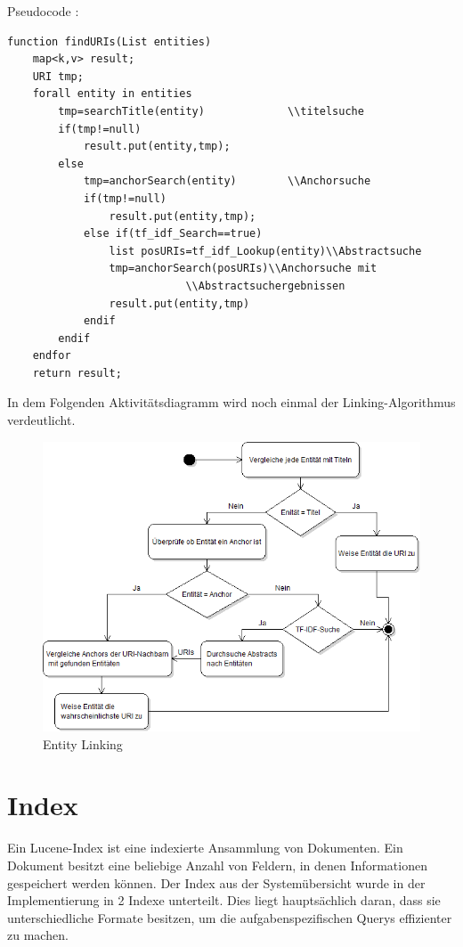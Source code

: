 \documentclass[11pt, a4paper, oneside]{Thesis} %
\begin{document}
Pseudocode :
\begin{lstlisting}
function findURIs(List entities)
	map<k,v> result;
	URI tmp;
	forall entity in entities
		tmp=searchTitle(entity)				\\titelsuche
		if(tmp!=null)
			result.put(entity,tmp);
		else
			tmp=anchorSearch(entity)		\\Anchorsuche
			if(tmp!=null)
				result.put(entity,tmp);
			else if(tf_idf_Search==true)
				list posURIs=tf_idf_Lookup(entity)\\Abstractsuche
				tmp=anchorSearch(posURIs)\\Anchorsuche mit 
							\\Abstractsuchergebnissen
				result.put(entity,tmp)
			endif
		endif
	endfor
	return result;
\end{lstlisting}
\clearpage
In dem Folgenden Aktivit\"atsdiagramm wird noch einmal der Linking-Algorithmus verdeutlicht.
\begin{figure}[ht!]
\centering
\includegraphics[scale=0.55]{./ablauf.png}
\caption[Entity Linking]{Entity Linking}
\end{figure}


\section{Index}
Ein Lucene-Index ist eine indexierte Ansammlung von Dokumenten. Ein Dokument besitzt eine beliebige Anzahl von Feldern, in denen Informationen gespeichert werden k\"onnen. 
Der Index aus der System\"ubersicht wurde in der Implementierung in 2 Indexe unterteilt. Dies liegt haupts\"achlich daran, dass sie unterschiedliche Formate  besitzen, um die aufgabenspezifischen Querys effizienter zu machen.
\end{document}
